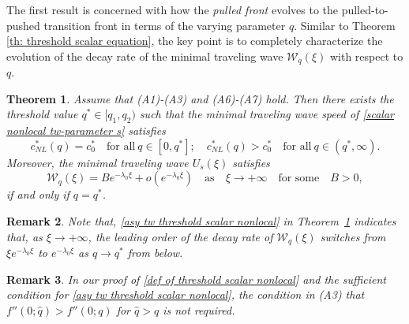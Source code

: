 \documentclass[11pt,a4paper]{article}
\newtheorem{theorem}{\textbf{Theorem}}[section]
\newtheorem{remark}[theorem]{\textbf{Remark}}
\numberwithin{equation}{section}
\numberwithin{figure}{section}
\begin{document}
The first result is concerned with how the {\em pulled front} %
evolves to the pulled-to-pushed transition front in terms of the varying parameter $q$. Similar to Theorem \ref{th: threshold scalar equation}, the key point is to completely characterize the evolution of the decay rate of the minimal traveling wave $\mathcal{W}_q(\xi)$ with respect to $q$.

\begin{theorem}\label{th: threshold scalar equation nonlocal}
Assume that (A1)-(A3) and (A6)-(A7) hold. Then there exists the threshold value $q^*\in[q_1,q_2)$ such that the minimal traveling wave speed of \eqref{scalar nonlocal tw-parameter s} satisfies
\begin{equation}\label{def of threshold scalar nonlocal}
c_{NL}^*(q)=c_0^*\quad\text{for all}\ q\in[0,q^*];\quad c_{NL}^*(q)>c_0^*\quad\text{for all}\ q\in(q^*,\infty).
\end{equation}
Moreover,
the minimal traveling wave $U_s(\xi)$ satisfies %
\begin{equation}\label{asy tw threshold scalar nonlocal}
\mathcal{W}_q(\xi)=Be^{-\lambda_0\xi}+o(e^{-\lambda_0\xi})\quad \mbox{as}\quad \xi\to+\infty\quad\text{for some}\quad B>0,
\end{equation}
if and only if $q=q^*$.
\end{theorem}


\begin{remark}
Note that, \eqref{asy tw threshold scalar nonlocal} in Theorem~\ref{th: threshold scalar equation nonlocal} indicates that, as $\xi\to+\infty$, the leading order of the decay rate of $\mathcal{W}_q(\xi)$ switches from $\xi e^{-\lambda_0\xi}$ to $e^{-\lambda_0\xi}$ as $q\to q^*$ from below.
\end{remark}

\begin{remark}
In our proof of \eqref{def of threshold scalar nonlocal} and the sufficient condition for \eqref{asy tw threshold scalar nonlocal},
the condition in (A3) that $f''(0;\hat{q})> f''(0;q)$ for $\hat{q}>q$ is not required.
\end{remark}
\end{document}
